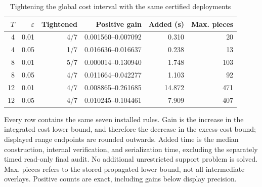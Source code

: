 \begin{table}[htbp]
\centering\footnotesize
\caption{Tightening the global cost interval with the same certified deployments}\label{tab:restart-summary}
\begin{tabular}{rrrrrr}\toprule
$T$ & $\varepsilon$ & Tightened & Positive gain & Added (s) & Max. pieces \\\midrule
4 & 0.01 & 4/7 & 0.001560--0.007092 & 0.310 & 20 \\
4 & 0.05 & 1/7 & 0.016636--0.016637 & 0.238 & 13 \\
8 & 0.01 & 5/7 & 0.000014--0.130940 & 1.748 & 103 \\
8 & 0.05 & 4/7 & 0.011664--0.042277 & 1.103 & 92 \\
12 & 0.01 & 4/7 & 0.008865--0.261685 & 14.872 & 471 \\
12 & 0.05 & 4/7 & 0.010245--0.104461 & 7.909 & 407 \\
\bottomrule\end{tabular}
\par\smallskip\begin{minipage}{.98\textwidth}\footnotesize Every row contains the same seven installed rules. Gain is the increase in the integrated cost lower bound, and therefore the decrease in the excess-cost bound; displayed range endpoints are rounded outwards. Added time is the median construction, internal verification, and serialization time, excluding the separately timed read-only final audit. No additional unrestricted support problem is solved. Max. pieces refers to the stored propagated lower bound, not all intermediate overlays. Positive counts are exact, including gains below display precision.\end{minipage}
\end{table}
